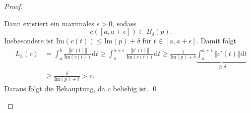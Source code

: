 \begin{theorem}
\begin{proof}
\begin{itemize}
      Dann existiert ein maximales \( \epsilon > 0 \), sodass
      \begin{equation*}
        c([a, a + \epsilon]) \subset B_\delta(p)\text{.}
      \end{equation*}
      Insbesondere ist \( \text{Im}(c(t)) \leq \text{Im}(p) + \delta \) für \( t \in [a, a + \epsilon] \). Damit folgt
      \begin{align*}
        L_h(c) &= \int_a^b \frac{\left\Vert c'(t) \right\Vert}{\text{Im}(c(t))}\text{d}t \geq \int_a^{a + \epsilon} \frac{\left\Vert c'(t) \right\Vert}{\text{Im}(c(t))}\text{d}t \geq \frac{1}{\text{Im}(p) + \delta} \underbrace{\int_a^{a + \epsilon}\left\Vert c'(t) \right\Vert \text{d}t}_{\geq \delta} \\
        &\geq \frac{\delta}{\text{Im}(p) + \delta} > c\text{.}
      \end{align*}
      Daraus folgt die Behauptung, da \( c \) beliebig ist. \qed
    \end{itemize}
  \end{proof}
\end{theorem}

